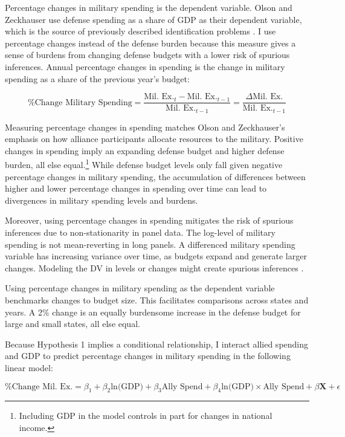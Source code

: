 \documentclass[12pt]{article}
\begin{document}
Percentage changes in military spending is the dependent variable. 
Olson and Zeckhauser use defense spending as a share of GDP as their dependent variable, which is the source of previously described identification problems \citep{Kronmal1993, PluemperNeumayer2015}. 
I use percentage changes instead of the defense burden because this measure gives a sense of burdens from changing defense budgets with a lower risk of spurious inferences. 
Annual percentage changes in spending is the change in military spending as a share of the previous year's budget:


\begin{equation}
\mbox{\% Change Military Spending} = \frac{\mbox{Mil. Ex.}_t - \mbox{Mil. Ex.}_{t-1} }{ \mbox{Mil. Ex.}_{t-1} } = \frac{\Delta \mbox{Mil. Ex.} }{ \mbox{Mil. Ex.}_{t-1} }
\end{equation} 


Measuring percentage changes in spending matches Olson and Zeckhauser's emphasis on how alliance participants allocate resources to the military.
Positive changes in spending imply an expanding defense budget and higher defense burden, all else equal.\footnote{Including GDP in the model controls in part for changes in national income.} 
While defense budget levels only fall given negative percentage changes in military spending, the accumulation of differences between higher and lower percentage changes in spending over time can lead to divergences in military spending levels and burdens. 


Moreover, using percentage changes in spending mitigates the risk of spurious inferences due to non-stationarity in panel data. 
The log-level of military spending is not mean-reverting in long panels.
A differenced military spending variable has increasing variance over time, as budgets expand and generate larger changes. 
Modeling the DV in levels or changes might create spurious inferences \citep{GrangerNewbold1974}. 


Using percentage changes in military spending as the dependent variable benchmarks changes to budget size. 
This facilitates comparisons across states and years. 
A 2\% change is an equally burdensome increase in the defense budget for large and small states, all else equal. 


Because Hypothesis 1 implies a conditional relationship, I interact allied spending and GDP to predict percentage changes in military spending in the following linear model:

\begin{equation} 
\mbox{\% Change Mil. Ex.} = \beta_1 + \beta_2 \mbox{ln(GDP)} + \beta_3 \mbox{Ally Spend} + \beta_4 \mbox{ln(GDP)} \times \mbox{Ally Spend} + \beta \mathbf{X} + \epsilon
\end{equation}
\end{document}
